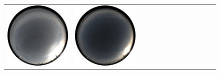 \begin{figure}
\begin{tabular}{@{}rcccccccccccc@{}}
    \includegraphics[width=\customwidth]{./figures/database/20141108_160025.jpg} &
    \includegraphics[width=\customwidth]{./figures/database/20141108_163025.jpg}


\end{tabular}
\end{figure}
